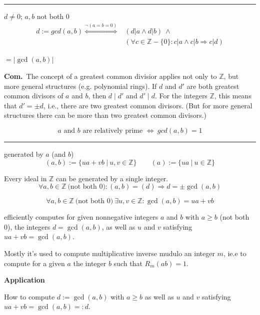 \documentclass[a4paper]{extarticle}
\newcommand{\Com}{\textbf{Com.}\ }
\newcommand{\Z}{\mathbb{Z}}
\newcommand{\abs}[1]{\lvert #1 \rvert}
\newcommand{\sep}{\vspace{5pt}\noindent\hrule\vspace{5pt}}
\begin{document}
\begin{multicols*}{2}
\sep

 $d\neq 0$; $a,b$ not both 0
\begin{align*}
d:=gcd(a,b)
\stackrel{\lnot(a=b=0)}{\Longleftrightarrow} &(d|a\land d|b) \ \land\\
&(\forall c\in \Z-\{0\}\colon c|a\land c|b\Rightarrow
c|d)
\end{align*}

 $=\abs{\gcd(a,b)}$

\Com The concept of a greatest common divisior applies not only to $\Z$, but more
general structures (e.g. polynomial rings). If $d$ and $d'$ are both greatest
common divisors of $a$ and $b$, then $d\mid d'$ and $d'\mid d$. For the integers
$\Z$, this means that $d'=\pm d$, i.e., there are two greatest common divisors.
(But for more general structures there can be more than two greatest common
divisors.)

\[
a \text{ and } b \text{ are relatively prime }
\Longleftrightarrow
\ gcd(a,b)=1
\]

\sep

\Def[Ideal] generated by $a$ (and $b$)
\[
(a,b) := \{ua+vb \ | \ u,v\in\Z\}
\qquad
(a) := \{ua\ | \ u\in\Z\}
\]

\Lem Every ideal in $\Z$ can be generated by a single integer.
\[
\forall a,b\in \Z \ \text{(not both 0)} \colon (a,b)=(d)\Longrightarrow
d=\pm\gcd(a,b)
\]

\Cor
\[
\forall a,b\in \Z \ \text{(not both 0)} \ \exists u,v\in\Z \colon
\gcd(a,b)=ua+vb
\]

 efficiently computes for given nonnegative
integers $a$ and $b$ with $a\geq b$ (not both 0), the integers $d=\gcd(a,b)$, 
as well as $u$ and $v$ satisfying $ua+vb=\gcd(a,b)$.

Mostly it's used to compute multiplicative inverse mudulo an integer $m$, ie.e
to compute for a given $a$ the integer $b$ such that $R_m(ab)=1$.

\textbf{Application}

How to compute $d:=\gcd(a,b)$ with $a\geq b$ as well as $u$ and $v$ satisfying
$ua+vb=\gcd(a,b)=:d$.




\end{multicols*}
\end{document}
